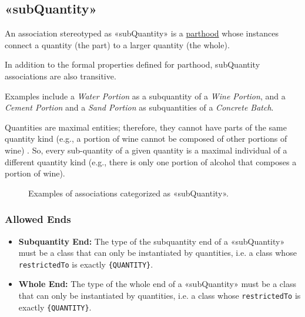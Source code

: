 


\subsection{«subQuantity»}
\label{stereotype:subQuantity}

An association stereotyped as «subQuantity» is a \hyperref[stereotype:parthood]{parthood} whose instances connect a quantity (the part) to a larger quantity (the whole).

In addition to the formal properties defined for parthood, subQuantity associations are also transitive.

Examples include a \textit{Water Portion} as a subquantity of a \textit{Wine Portion}, and a \textit{Cement Portion} and a \textit{Sand Portion} as subquantities of a \textit{Concrete Batch}.

Quantities are maximal entities; therefore, they cannot have parts of the same quantity kind (e.g., a portion of wine cannot be composed of other portions of wine) \cite{guizzardi2010fois}. So, every sub-quantity of a given quantity is a maximal individual of a different quantity kind (e.g., there is only one portion of alcohol that composes a portion of wine). 

\begin{figure}[h]
    \centering
    
    \caption{Examples of associations categorized as «subQuantity».}
    \label{fig:subQuantity-example}
\end{figure}


\subsubsection{Allowed Ends}

\begin{itemize}
    \item \textbf{Subquantity End:} The type of the subquantity end of a «subQuantity» must be a class that can only be instantiated by quantities, i.e. a class whose  \texttt{restrictedTo} is exactly \texttt{\{QUANTITY\}}.
    \item \textbf{Whole End:} The type of the whole end of a «subQuantity» must be a class that can only be instantiated by quantities, i.e. a class whose  \texttt{restrictedTo} is exactly \texttt{\{QUANTITY\}}.
\end{itemize}

